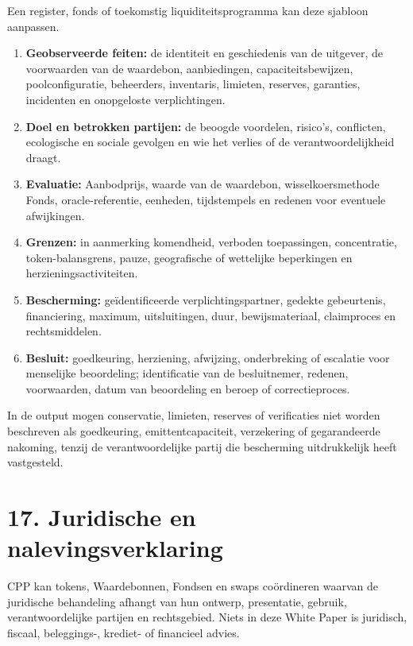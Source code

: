 \documentclass[11pt]{article}
\begin{document}
Een register, fonds of toekomstig liquiditeitsprogramma kan deze sjabloon aanpassen.

\begin{enumerate}[leftmargin=*]
\item \textbf{Geobserveerde feiten:} de identiteit en geschiedenis van de uitgever, de voorwaarden van de waardebon, aanbiedingen, capaciteitsbewijzen, poolconfiguratie, beheerders, inventaris, limieten, reserves, garanties, incidenten en onopgeloste verplichtingen.
\item \textbf{Doel en betrokken partijen:} de beoogde voordelen, risico's, conflicten, ecologische en sociale gevolgen en wie het verlies of de verantwoordelijkheid draagt.
\item \textbf{Evaluatie:} Aanbodprijs, waarde van de waardebon, wisselkoersmethode Fonds, oracle-referentie, eenheden, tijdstempels en redenen voor eventuele afwijkingen.
\item \textbf{Grenzen:} in aanmerking komendheid, verboden toepassingen, concentratie, token-balansgrens, pauze, geografische of wettelijke beperkingen en herzieningsactiviteiten.
\item \textbf{Bescherming:} geïdentificeerde verplichtingspartner, gedekte gebeurtenis, financiering, maximum, uitsluitingen, duur, bewijsmateriaal, claimproces en rechtsmiddelen.
\item \textbf{Besluit:} goedkeuring, herziening, afwijzing, onderbreking of escalatie voor menselijke beoordeling; identificatie van de besluitnemer, redenen, voorwaarden, datum van beoordeling en beroep of correctieproces.
\end{enumerate}
In de output mogen conservatie, limieten, reserves of verificaties niet worden beschreven als goedkeuring, emittentcapaciteit, verzekering of gegarandeerde nakoming, tenzij de verantwoordelijke partij die bescherming uitdrukkelijk heeft vastgesteld.


\section*{17. Juridische en nalevingsverklaring}

CPP kan tokens, Waardebonnen, Fondsen en swaps coördineren waarvan de juridische behandeling afhangt van hun ontwerp, presentatie, gebruik, verantwoordelijke partijen en rechtsgebied. Niets in deze White Paper is juridisch, fiscaal, beleggings-, krediet- of financieel advies.
\end{document}
